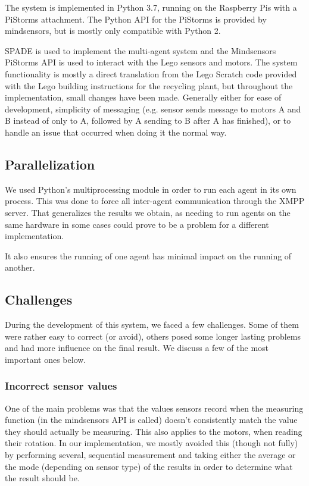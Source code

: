 \documentclass[conference]{IEEEtran}
\begin{document}
The system is implemented in Python 3.7, running on the Raspberry Pis with a PiStorms attachment. The Python API for the PiStorms is provided by mindsensors, but is mostly only compatible with Python 2. 

SPADE is used to implement the multi-agent system and the Mindsensors PiStorms API is used to interact with the Lego sensors and motors. The system functionality is mostly a direct translation from the Lego Scratch code provided with the Lego building instructions for the recycling plant, but throughout the implementation, small changes have been made. Generally either for ease of development, simplicity of messaging (e.g. sensor sends message to motors A and B instead of only to A, followed by A sending to B after A has finished), or to handle an issue that occurred when doing it the normal way. 

\subsection{Parallelization}

We used Python's multiprocessing module in order to run each agent in its own process. This was done to force all inter-agent communication through the XMPP server. That generalizes the results we obtain, as needing to run agents on the same hardware in some cases could prove to be a problem for a different implementation.

It also ensures the running of one agent has minimal impact on the running of another. 

\subsection{Challenges}

During the development of this system, we faced a few challenges. Some of them were rather easy to correct (or avoid), others posed some longer lasting problems and had more influence on the final result. We discuss a few of the most important ones below.

\subsubsection{Incorrect sensor values}
One of the main problems was that the values sensors record when the measuring function (in the mindsensors API is called) doesn't consistently match the value they should actually be measuring. This also applies to the motors, when reading their rotation. In our implementation, we mostly avoided this (though not fully) by performing several, sequential measurement and taking either the average or the mode (depending on sensor type) of the results in order to determine what the result should be. 
\end{document}
